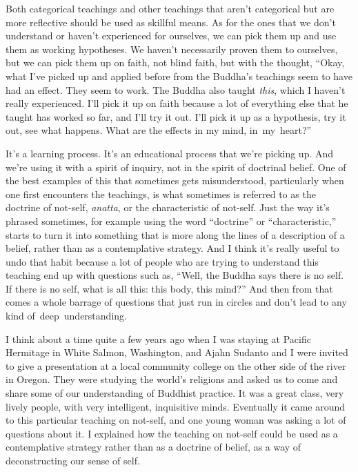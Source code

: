 Both categorical teachings and other teachings that aren't categorical but are more reflective should be used as skillful means. As for the ones that we don't understand or haven't experienced for ourselves, we can pick them up and use them as working hypotheses. We haven't necessarily proven them to ourselves, but we can pick them up on faith, not blind faith, but with the thought, ``Okay, what I've picked up and applied before from the Buddha's teachings seem to have had an effect. They seem to work. The Buddha also taught \emph{this}, which I haven't really experienced. I'll pick it up on faith because a lot of everything else that he taught has worked so far, and I'll try it out. I'll pick it up as a hypothesis, try it out, see what happens. What are the effects in my mind, \mbox{in my heart?''}

It's a learning process. It's an educational process that we're picking up. And we're using it with a spirit of inquiry, not in the spirit of doctrinal belief. One of the best examples of this that sometimes gets misunderstood, particularly when one first encounters the teachings, is what sometimes is referred to as the doctrine of not-self, \emph{anatta}, or the characteristic of not-self. Just the way it's phrased sometimes, for example using the word ``doctrine'' or ``characteristic,'' starts to turn it into something that is more along the lines of a description of a belief, rather than as a contemplative strategy. And I think it's really useful to undo that habit because a lot of people who are trying to understand this teaching end up with questions such as, ``Well, the Buddha says there is no self. If there is no self, what is all this: this body, this mind?'' And then from that comes a whole barrage of questions that just run in circles and don't lead to any kind \mbox{of deep understanding.}

\enlargethispage{1\baselineskip}
I think about a time quite a few years ago when I was staying at Pacific Hermitage in White Salmon, Washington, and Ajahn Sudanto and I were invited to give a presentation at a local community college on the other side of the river in Oregon. They were studying the world's religions and asked us to come and share some of our understanding of Buddhist practice. It was a great class, very lively people, with very intelligent, inquisitive minds. Eventually it came around to this particular teaching on not-self, and one young woman was asking a lot of questions about it. I explained how the teaching on not-self could be used as a contemplative strategy rather than as a doctrine of belief, as a way of deconstructing our sense of self.

